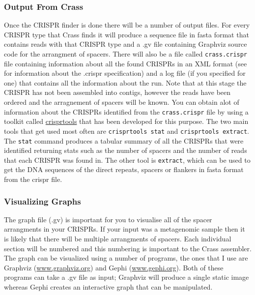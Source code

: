 \documentclass[11pt]{article} %
\begin{document}
\subsubsection{Output From Crass}
Once the CRISPR finder is done there will be a number of output files.  
For every CRISPR type that Crass finds it will produce a sequence file in fasta format that contains reads with that CRISPR type and a .gv file containing Graphviz source code for the arrangment of spacers.  
There will also be a file called \texttt{crass.crispr} file containing information about all the found CRISPRs in an XML format (see  for information about the .crispr specification) and a log file (if you specified for one) that contains all the information about the run. 
Note that at this stage the CRISPR has not been assembled into contigs, however the reads have been ordered and the arragnement of spacers will be known.  
You can obtain alot of information about the CRISPRs identified from the \texttt{crass.crispr} file by using a toolkit called \href{ctskennerton.github.com/crisprtools}{crisprtools} that has been developed for this purpose.  
The two main tools that get used most often are \texttt{crisprtools stat} and \texttt{crisprtools extract}.  
The \texttt{stat} command produces a tabular summary of all the CRISPRs that were identified returning stats such as the number of spacers and the number of reads that each CRISPR was found in.
The other tool is \texttt{extract}, which can be used to get the DNA sequences of the direct repeats, spacers or flankers in fasta format from the crispr file.


\subsubsection{Visualizing Graphs}
The graph file (.gv) is important for you to visualise all of the spacer arrangments in your CRISPRs.  If your input was a metagenomic sample then it is likely that there will be multiple arrangments of spacers.  Each individual section will be numbered and this numbering is important to the Crass assembler.  The graph can be visualized using a number of programs, the ones that I use are Graphviz (\url{www.graphviz.org}) and Gephi (\url{www.gephi.org}).  Both of these programs can take a .gv file as input; Graphviz will produce a single static image whereas Gephi creates an interactive graph that can be manipulated.
\end{document}
